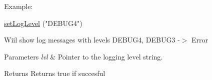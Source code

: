 Example\-:
\begin{DoxyCode}
\hyperlink{group__logging_gad113b4e32a079d7a8c1d188561e1ffbc}{setLogLevel} (\textcolor{stringliteral}{"DEBUG4"}) 
\end{DoxyCode}


Wiil show log messages with levels D\-E\-B\-U\-G4, D\-E\-B\-U\-G3 -\/$>$ Error


\begin{DoxyParams}{Parameters}
{\em lvl} & Pointer to the logging level string. \\
\hline
\end{DoxyParams}
\begin{DoxyReturn}{Returns}
Returns true if succesful 
\end{DoxyReturn}
